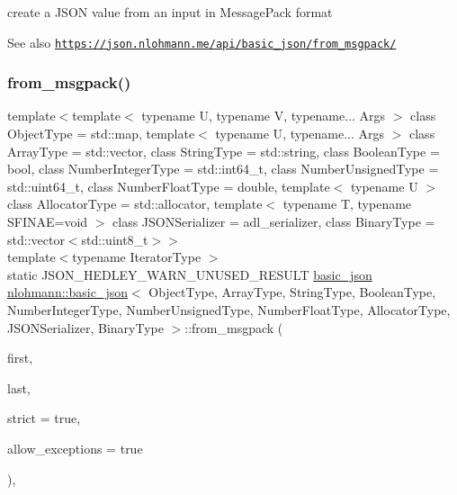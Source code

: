 create a J\+S\+ON value from an input in Message\+Pack format 

\begin{DoxySeeAlso}{See also}
\href{https://json.nlohmann.me/api/basic_json/from_msgpack/}{\tt https\+://json.\+nlohmann.\+me/api/basic\+\_\+json/from\+\_\+msgpack/} 
\end{DoxySeeAlso}
\mbox{\label{classnlohmann_1_1basic__json_a94dbeb08bcd13821512957dcbf3f00bd}} 
\subsubsection{\texorpdfstring{from\+\_\+msgpack()}{from\_msgpack()}\hspace{0.1cm}{\footnotesize\ttfamily [2/2]}}
{\footnotesize\ttfamily template$<$template$<$ typename U, typename V, typename... Args $>$ class Object\+Type = std\+::map, template$<$ typename U, typename... Args $>$ class Array\+Type = std\+::vector, class String\+Type  = std\+::string, class Boolean\+Type  = bool, class Number\+Integer\+Type  = std\+::int64\+\_\+t, class Number\+Unsigned\+Type  = std\+::uint64\+\_\+t, class Number\+Float\+Type  = double, template$<$ typename U $>$ class Allocator\+Type = std\+::allocator, template$<$ typename T, typename S\+F\+I\+N\+A\+E=void $>$ class J\+S\+O\+N\+Serializer = adl\+\_\+serializer, class Binary\+Type  = std\+::vector$<$std\+::uint8\+\_\+t$>$$>$ \\
template$<$typename Iterator\+Type $>$ \\
static J\+S\+O\+N\+\_\+\+H\+E\+D\+L\+E\+Y\+\_\+\+W\+A\+R\+N\+\_\+\+U\+N\+U\+S\+E\+D\+\_\+\+R\+E\+S\+U\+LT \hyperlink{classnlohmann_1_1basic__json}{basic\+\_\+json} \hyperlink{classnlohmann_1_1basic__json}{nlohmann\+::basic\+\_\+json}$<$ Object\+Type, Array\+Type, String\+Type, Boolean\+Type, Number\+Integer\+Type, Number\+Unsigned\+Type, Number\+Float\+Type, Allocator\+Type, J\+S\+O\+N\+Serializer, Binary\+Type $>$\+::from\+\_\+msgpack (\begin{DoxyParamCaption}\item[{Iterator\+Type}]{first,  }\item[{Iterator\+Type}]{last,  }\item[{const bool}]{strict = {\ttfamily true},  }\item[{const bool}]{allow\+\_\+exceptions = {\ttfamily true} }\end{DoxyParamCaption})\hspace{0.3cm}{\ttfamily [inline]}, {\ttfamily [static]}}



